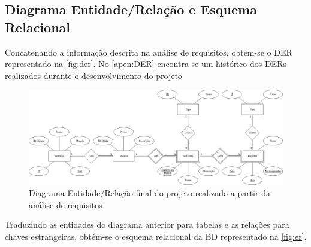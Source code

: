 \documentclass[11pt,twoside,a4paper]{report}
\begin{document}
\subsection{Diagrama Entidade/Relação e Esquema Relacional}
Concatenando a informação descrita na análise de requisitos, obtém-se o DER representado na \autoref{fig:der}. No \autoref{apen:DER} encontra-se um histórico dos DERs realizados durante o desenvolvimento do projeto\par
\newpage
\begin{landscape}
	\begin{figure}
		\begin{center}
			\includegraphics[width=1.4\textwidth]{diagrama_entidade_relacao} %
			\caption[Diagrama Entidade/Relação final do projeto]{Diagrama Entidade/Relação final do projeto realizado a partir da análise de requisitos}
			\label{fig:der}
		\end{center}
	\end{figure}
\end{landscape}
Traduzindo as entidades do diagrama anterior para tabelas e as relações para chaves estrangeiras, obtém-se o esquema relacional da BD representado na \autoref{fig:er}.
\end{document}
